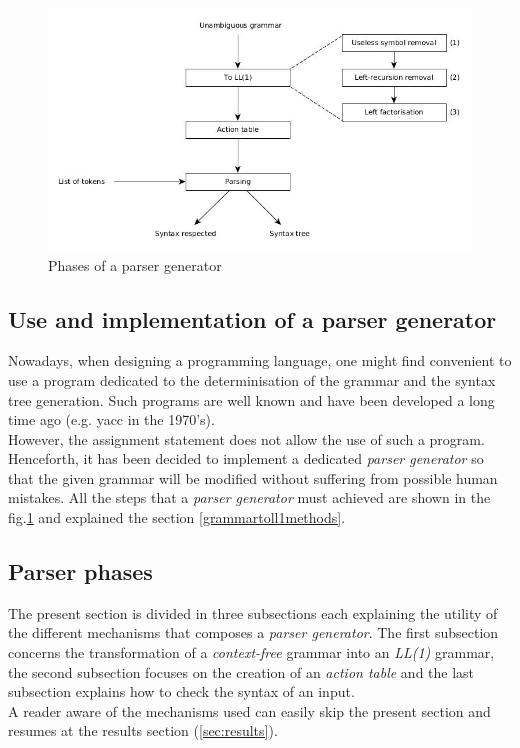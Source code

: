 \documentclass[a4paper,11pt]{article}
\begin{document}
  \begin{figure}[h!]
    \centering
    \includegraphics[scale=0.45]{./img/phase_of_parsing.jpg}
    \caption{Phases of a parser generator}
    \label{fig:parsergeneratorphases}
  \end{figure}
  
  \subsection{Use and implementation of a parser generator}
  Nowadays, when designing a programming language, one might find convenient to use a program dedicated to the determinisation of the grammar and the syntax tree generation. Such programs are well known and have been developed a long time ago (e.g. yacc in the 1970's).\\
  However, the assignment statement does not allow the use of such a program. Henceforth, it has been decided to implement a dedicated \textit{parser generator} so that the given grammar will be modified without suffering from possible human mistakes. All the steps that a \textit{parser generator} must achieved are shown in the fig.\ref{fig:parsergeneratorphases} and explained the section \ref{grammartoll1methods}.
  
  \subsection{Parser phases}
    The present section is divided in three subsections each explaining the utility of the different mechanisms that composes a \textit{parser generator}. The first subsection concerns the transformation of a \textit{context-free} grammar into an \textit{LL(1)} grammar, the second subsection focuses on the creation of an \textit{action table} and the last subsection explains how to check the syntax of an input.\\
    A reader aware of the mechanisms used can easily skip the present section and resumes at the results section (\ref{sec:results}).
  
\end{document}
